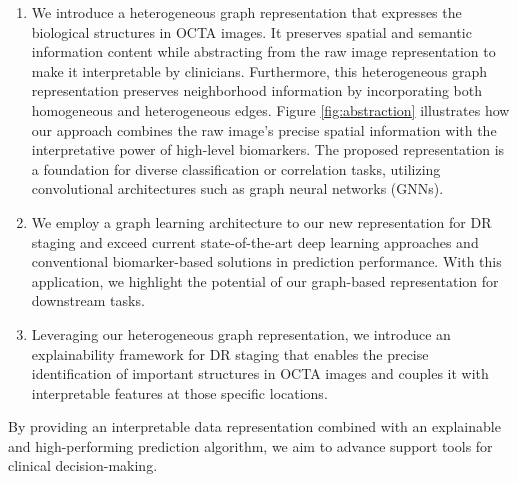\begin{enumerate}
    \item We introduce a heterogeneous graph representation that expresses the biological structures in OCTA images. It preserves spatial and semantic information content while abstracting from the raw image representation to make it interpretable by clinicians. Furthermore, this heterogeneous graph representation preserves neighborhood information by incorporating both homogeneous and heterogeneous edges. Figure \ref{fig:abstraction} illustrates how our approach combines the raw image's precise spatial information with the interpretative power of high-level biomarkers. The proposed representation is a foundation for diverse classification or correlation tasks, utilizing convolutional architectures such as graph neural networks (GNNs).

    \item We employ a graph learning architecture to our new representation for DR staging and exceed current state-of-the-art deep learning approaches and conventional biomarker-based solutions in prediction performance. With this application, we highlight the potential of our graph-based representation for downstream tasks.

    \item Leveraging our heterogeneous graph representation, we introduce an explainability framework for DR staging that enables the precise identification of important structures in OCTA images and couples it with interpretable features at those specific locations.
    
\end{enumerate}

By providing an interpretable data representation combined with an explainable and high-performing prediction algorithm, we aim to advance support tools for clinical decision-making.
